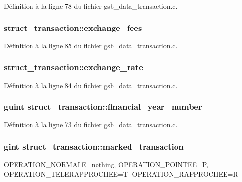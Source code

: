 Définition à la ligne 78 du fichier gsb\_\-data\_\-transaction.c.

\subsubsection[{exchange\_\-fees}]{ {\bf struct\_\-transaction::exchange\_\-fees}}\label{structstruct__transaction_a4267f7f81d486cc4795f91b38b832df2}


Définition à la ligne 85 du fichier gsb\_\-data\_\-transaction.c.

\subsubsection[{exchange\_\-rate}]{ {\bf struct\_\-transaction::exchange\_\-rate}}\label{structstruct__transaction_aedcda507e04c4175bcfeee402b66ce06}


Définition à la ligne 84 du fichier gsb\_\-data\_\-transaction.c.

\subsubsection[{financial\_\-year\_\-number}]{\setlength{\rightskip}{0pt plus 5cm}guint {\bf struct\_\-transaction::financial\_\-year\_\-number}}\label{structstruct__transaction_aef71093dc7b53b93cfb07a9cdfa64252}


Définition à la ligne 73 du fichier gsb\_\-data\_\-transaction.c.

\subsubsection[{marked\_\-transaction}]{\setlength{\rightskip}{0pt plus 5cm}gint {\bf struct\_\-transaction::marked\_\-transaction}}\label{structstruct__transaction_a9ccf3249b61307eebc83e19602ecc006}
OPERATION\_\-NORMALE=nothing, OPERATION\_\-POINTEE=P, OPERATION\_\-TELERAPPROCHEE=T, OPERATION\_\-RAPPROCHEE=R 


